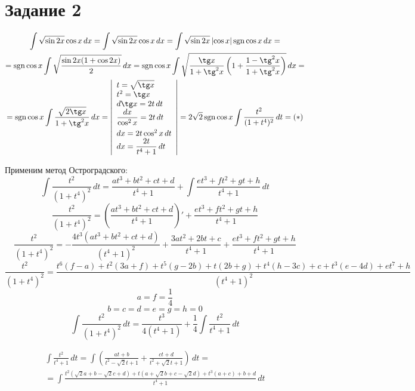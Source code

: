 \section{Задание 2}
\begin{multline*}
    \int \sqrt{\sin 2x} \cos x \, dx = \int \sqrt{\sin 2x} \cos x \, dx =
        \int \sqrt{\sin 2x} \left| \cos x\right| \sgn \cos x \, dx = \\ =
        \sgn \cos x \int \sqrt{\frac{\sin 2x (1 + \cos 2x)}{2}} \, dx =
        \sgn \cos x \int \sqrt{\frac{\tg
            x}{1+\tg^2x}\left(1+\frac{1-\tg^2x}{1+\tg^2x}\right)} \, dx = \\ =
        \sgn \cos x \int \frac{\sqrt{2\tg x}}{1+\tg^2x} \, dx = 
        \left| \begin{array}{l}
            t = \sqrt{\tg x} \\
            t^2 = \tg x \\
            d \tg x = 2t \, dt \\
            \displaystyle\frac{dx}{\cos^2 x} = 2t \, dt \\[0.3cm]
            dx = 2t \cos^2 x \, dt \\
        dx = \displaystyle\frac{2t}{t^4+1} \, dt
        \end{array} \right| = 
        2 \sqrt{2} \sgn \cos x \int \frac{t^2}{(1+t^4)^2} \, dt = (*)
\end{multline*}

\HRule

Применим метод Остроградского:
\[ \int \frac{t^2}{(1+t^4)^2} \, dt = \frac{a t^3+b t^2+c t+d}{t^4+1}+ \int \frac{e t^3+f t^2+g t+h}{t^4+1} \, dt \]
\[ \frac{t^2}{(1+t^4)^2} = \left(\frac{a t^3+b t^2+c
    t+d}{t^4+1}\right)' + \frac{e t^3+f t^2+g t+h}{t^4+1} \]
\[ \frac{t^2}{(1+t^4)^2} = -\frac{4 t^3 \left(a t^3+b t^2+c
    t+d\right)}{\left(t^4+1\right)^2}+\frac{3 a t^2+2 b t+c}{t^4+1}+\frac{e
    t^3+f t^2+g t+h}{t^4+1} \]
\[ \frac{t^2}{(1+t^4)^2} = \frac{t^6 (f-a)+t^2 (3 a+f)+t^5 (g-2 b)+t (2 b+g)+
    t^4 (h-3 c)+c+t^3 (e-4 d)+e t^7+h}{\left(t^4+1\right)^2} \]
\[ a = f = \frac{1}{4} \]
\[ b = c = d = e = g = h = 0 \]
\[ \int \frac{t^2}{(1+t^4)^2} \, dt = \frac{t^3}{4 \left(t^4+1\right)}+
    \frac{1}{4} \int \frac{t^2}{t^4+1} \, dt\]

\HRule

\begin{multline*}
    \int \frac{t^2}{t^4+1} \, dt = \int \left(\frac{a t+b}{t^2-\sqrt{2}
        t+1}+\frac{c t+d}{t^2+\sqrt{2} t+1}\right) \, dt = \\ =
    \int \frac{t^2 \left(\sqrt{2} a+b-\sqrt{2} c+d\right)+
        t \left(a+\sqrt{2} b+c-\sqrt{2} d\right)+t^3 (a+c)+b+d}{t^4+1} \, dt 
\end{multline*}

